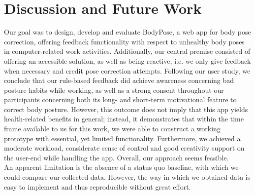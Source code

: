 

\section{Discussion and Future Work} %
\label{discussion-future-work}

Our goal was to design, develop and evaluate BodyPose, a web app for body pose correction, offering feedback functionality with respect to unhealthy body poses in computer-related work activities. Additionally, our central premise consisted of offering an accessible solution, as well as being reactive, i.e. we only give feedback when necessary and credit pose correction attempts. 
Following our user study, we conclude that our rule-based feedback did achieve awareness concerning bad posture habits while working, as well as a strong consent throughout our participants concerning both its long- and short-term motivational feature to correct body posture. However, this outcome does not imply that this app yields health-related benefits in general; instead, it demonstrates that within the time frame available to us for this work, we were able to construct a working prototype with essential, yet limited functionality. Furthermore, we achieved a moderate workload, considerate sense of control and good creativity support on the user-end while handling the app. Overall, our approach seems feasible.\\ An apparent limitation is the absence of a status quo baseline, with which we could compare our collected data. However, the way in which we obtained data is easy to implement and thus reproducible without great effort.

